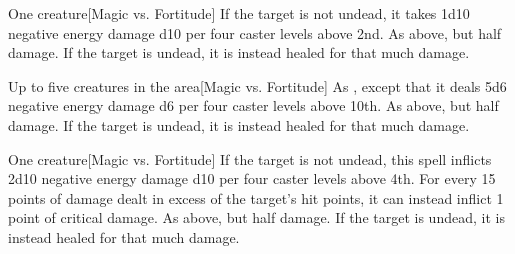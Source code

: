 \begin{spellheader}
    \spellrng{\rngclose}
\end{spellheader}
\begin{spelleffects}
    \begin{spelltarget}{One creature}[Magic vs. Fortitude]
        \spellsuccess If the target is not undead, it takes 1d10 negative energy damage \add d10 per four caster levels above 2nd.
        \spellfailure As above, but half damage.
        \spelleffect If the target is undead, it is instead healed for that much damage.
    \end{spelltarget}
\end{spelleffects}
\begin{spellfooter}
    
\end{spellfooter}

\begin{spellheader}
\end{spellheader}
\begin{spelleffects}
    \begin{spelltargets}{Up to five creatures in the area}[Magic vs. Fortitude]
        \spellsuccess As , except that it deals 5d6 negative energy damage \add d6 per four caster levels above 10th.
        \spellfailure As above, but half damage.
        \spelleffect If the target is undead, it is instead healed for that much damage.
    \end{spelltargets}
\end{spelleffects}
\begin{spellfooter}
    
\end{spellfooter}

\begin{spellheader}
    \spellrng{\rngclose}
\end{spellheader}
\begin{spelleffects}
    \begin{spelltarget}{One creature}[Magic vs. Fortitude]
        \spellsuccess If the target is not undead, this spell inflicts 2d10 negative energy damage \add d10 per four caster levels above 4th. For every 15 points of damage dealt in excess of the target's hit points, it can instead inflict 1 point of critical damage.
        \spellfailure As above, but half damage.
        \spelleffect If the target is undead, it is instead healed for that much damage.
    \end{spelltarget}
\end{spelleffects}
\begin{spellfooter}
    
\end{spellfooter}

